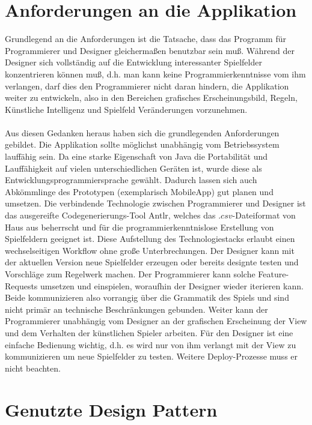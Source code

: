 \documentclass[conference]{IEEEtran}
\begin{document}
\section{Anforderungen an die Applikation}

Grundlegend an die Anforderungen ist die Tatsache, dass das Programm f\"ur Programmierer und Designer gleicherma\ss en benutzbar sein mu\ss. W\"ahrend der Designer sich vollst\"andig auf die Entwicklung interessanter Spielfelder konzentrieren k\"onnen mu\ss, d.h. man kann keine Programmierkenntnisse vom ihm verlangen, darf dies den Programmierer nicht daran hindern, die Applikation weiter zu entwickeln, also
in den Bereichen grafisches Erscheinungsbild, Regeln, K\"unstliche Intelligenz und Spielfeld Ver\"anderungen vorzunehmen. \\\\
Aus diesen Gedanken
heraus haben sich die grundlegenden Anforderungen gebildet.
Die Applikation sollte m\"oglichst unabh\"angig vom Betriebssystem lauff\"ahig sein. Da eine starke Eigenschaft von Java die Portabilit\"at und
Lauff\"ahigkeit auf vielen unterschiedlichen Ger\"aten ist, wurde diese als Entwicklungsprogrammiersprache gew\"ahlt. Dadurch lassen sich auch Abk\"ommlinge
des Prototypen (exemplarisch MobileApp) gut planen und umsetzen. Die verbindende Technologie zwischen Programmierer und Designer ist das ausgereifte
Codegenerierungs-Tool Antlr, welches das $.csv$-Dateiformat von Haus aus beherrscht und f\"ur die programmierkenntnislose Erstellung von Spielfeldern
geeignet ist. Diese Aufstellung des Technologiestacks erlaubt einen wechselseitigen Workflow ohne gro\ss e Unterbrechungen. Der Designer kann
mit der aktuellen Version neue Spielfelder erzeugen oder bereits designte testen und Vorschl\"age zum Regelwerk machen. Der Programmierer
kann solche Feature-Requests umsetzen und einspielen, woraufhin der Designer wieder iterieren kann. Beide kommunizieren also vorrangig
\"uber die Grammatik des Spiels und sind nicht prim\"ar an technische Beschr\"ankungen gebunden. Weiter kann der Programmierer unabh\"angig vom Designer
an der grafischen Erscheinung der View und dem Verhalten der k\"unstlichen Spieler arbeiten. F\"ur den Designer ist eine einfache Bedienung
wichtig, d.h. es wird nur von ihm verlangt mit der View zu kommunizieren um neue Spielfelder zu testen. Weitere Deploy-Prozesse muss er nicht beachten.


\section{Genutzte Design Pattern}
\end{document}
